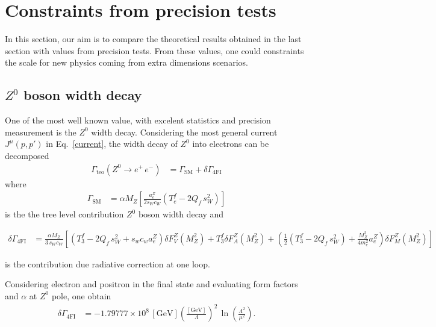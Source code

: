 \section{Constraints from precision tests}
In this section, our aim is to compare the theoretical results obtained in the last section with values from precision tests. From these values, one could constraints the scale for new physics coming from extra dimensions scenarios.

\subsection{$Z^0$ boson width decay}

One of the most well known value, with excelent statistics and precision measurement is the $Z^0$ width decay. Considering the most general current $J^\mu(p,p')$ in Eq.~\eqref{current}, the width decay of $Z^0$ into electrons can be decomposed
\begin{align}
\Gamma_{\text{teo}}\left(Z^0\rightarrow e^+\,e^-\right) &= \Gamma_{\text{SM}} + \delta\Gamma_{\text{4FI}}
\end{align}
where
\begin{align}
 \Gamma_{\text{SM}} &= \alpha M_Z\left[\frac{a_e^Z}{2s_Wc_W}(T_e^f - 2Q_f\,s_W^2)\right] 
\end{align}
is the the tree level contribution $Z^0$ boson width decay and
\begin{widetext}
\begin{align}
\nonumber
  \delta\Gamma_{\text{4FI}} &= \frac{\alpha M_Z}{3\,s_Wc_W}\left[(T_3^f - 2Q_f\,s_W^2+s_wc_wa_e^Z)\delta F_V^Z(M_Z^2) + T_3^f\delta F_A^Z(M_Z^2) + \left(\frac{1}{2}(T_3^f - 2Q_f\,s_W^2) +\frac{M_Z^2}{4m_e^2}a_e^Z\right)\delta F_M^Z(M_Z^2)\right]
\end{align}
\end{widetext}
is the contribution due radiative correction at one loop. 

Considering electron and positron in the final state and evaluating form factors and $\alpha$ at $Z^0$ pole, one obtain 
\begin{align}
\label{deltagammateo}
 \delta\Gamma_{\text{4FI}} &= -1.79777\times10^8\,[\text{GeV}]\left(\frac{[\text{GeV}]}{\Lambda}\right)^2\,\ln\left(\frac{\Lambda^2}{\mu^2}\right).
\end{align}

